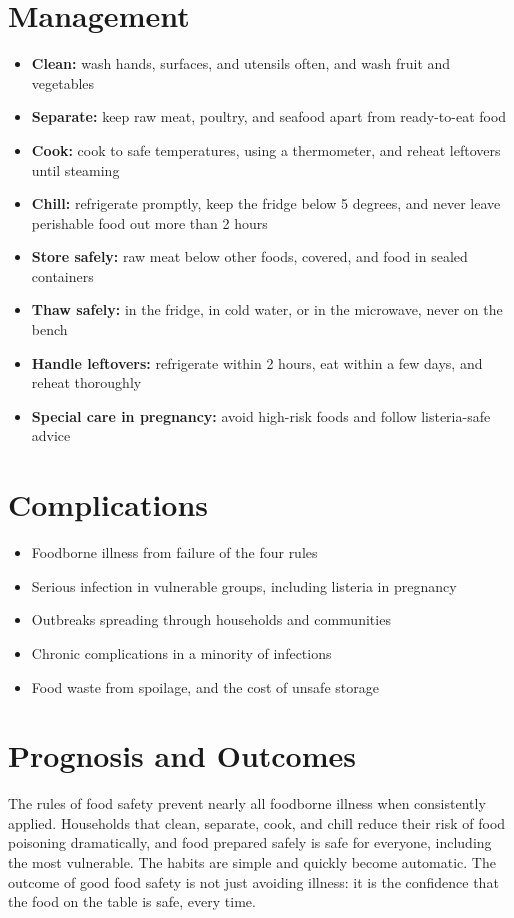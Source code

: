 \section*{Management}
\begin{itemize}
    \item \textbf{Clean:} wash hands, surfaces, and utensils often, and wash fruit and vegetables
    \item \textbf{Separate:} keep raw meat, poultry, and seafood apart from ready-to-eat food
    \item \textbf{Cook:} cook to safe temperatures, using a thermometer, and reheat leftovers until steaming
    \item \textbf{Chill:} refrigerate promptly, keep the fridge below 5 degrees, and never leave perishable food out more than 2 hours
    \item \textbf{Store safely:} raw meat below other foods, covered, and food in sealed containers
    \item \textbf{Thaw safely:} in the fridge, in cold water, or in the microwave, never on the bench
    \item \textbf{Handle leftovers:} refrigerate within 2 hours, eat within a few days, and reheat thoroughly
    \item \textbf{Special care in pregnancy:} avoid high-risk foods and follow listeria-safe advice
\end{itemize}

\section*{Complications}
\begin{itemize}
    \item Foodborne illness from failure of the four rules
    \item Serious infection in vulnerable groups, including listeria in pregnancy
    \item Outbreaks spreading through households and communities
    \item Chronic complications in a minority of infections
    \item Food waste from spoilage, and the cost of unsafe storage
\end{itemize}

\section*{Prognosis and Outcomes}
The rules of food safety prevent nearly all foodborne illness when consistently applied. Households that clean, separate, cook, and chill reduce their risk of food poisoning dramatically, and food prepared safely is safe for everyone, including the most vulnerable. The habits are simple and quickly become automatic. The outcome of good food safety is not just avoiding illness: it is the confidence that the food on the table is safe, every time.

